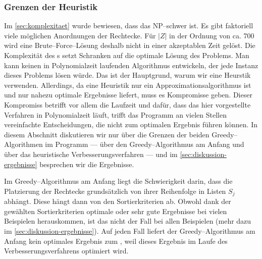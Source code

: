 \subsubsection{Grenzen der Heuristik}\label{sec:diskussion-grenzen}
Im \cref{sec:komplexitaet} wurde bewiesen, dass das \fp{} NP--schwer ist.
Es gibt faktoriell viele möglichen Anordnungen der Rechtecke.
Für $|Z|$ in der Ordnung von ca. 700 wird eine Brute--Force--Lösung deshalb nicht in einer
akzeptablen Zeit gelöst.
Die Komplexität des \fp{}s setzt Schranken auf die optimale Lösung des Problems.
Man kann keinen in Polynomialzeit laufenden Algorithmus entwickeln, der jede Instanz dieses
Problems lösen würde.
Das ist der Hauptgrund, warum wir eine Heurstik verwenden.
Allerdings, da eine Heuristik nur ein Approximationsalgorithmus ist und
nur nahezu optimale Ergebnisse liefert, muss es Kompromisse geben.
Dieser Kompromiss betrifft vor allem die Laufzeit und 
dafür, dass das hier vorgestellte Verfahren in Polynomialzeit läuft, 
trifft das Programm an vielen Stellen vereinfachte Entscheidungen,
die nicht zum optimalen Ergebnis führen können.
In diesem Abschnitt diskutieren wir nur über die Grenzen der beiden Greedy--Algorithmen im Programm 
--- über den Greedy--Algorithmus am Anfang und über das heuristische 
Verbesserungsverfahren ---
und im \cref{sec:diskussion-ergebnisse} besprechen wir die Ergebnisse.


Im Greedy--Algorithmus am Anfang liegt die Schwierigkeit darin, dass
die Platzierung der Rechtecke grundsätzlich von ihrer Reihenfolge 
in Listen $S_j$ abhängt. Diese hängt dann von den Sortierkriterien ab. 
Obwohl dank der gewählten Sortierkriterien optimale oder sehr gute Ergebnisse
bei vielen Beispielen herauskommen, ist das nicht der Fall bei allen Beispielen
(mehr dazu im \cref{sec:diskussion-ergebnisse}).
Auf jeden Fall liefert der Greedy--Algorithmus am Anfang kein optimales Ergebnis zum ,
weil dieses Ergebnis im Laufe des Verbesserungsverfahrens optimiert wird.


